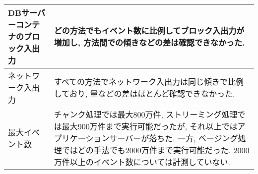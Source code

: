 \documentclass[../../../main]{subfiles}
\begin{document}
\begin{table}[H]
\begin{tabular}{|p{4cm}|p{10cm}|}
            DBサーバーコンテナのブロック入出力       & どの方法でもイベント数に比例してブロック入出力が増加し, 方法間での傾きなどの差は確認できなかった.                                                                                                                                                                                      \\ \hline
            ネットワーク入出力                & すべての方法でネットワーク入出力は同じ傾きで比例しており, 量などの差はほとんど確認できなかった.                                                                                                                                                                                    \\ \hline
            最大イベント数                  & チャンク処理では最大800万件, ストリーミング処理では最大900万件まで実行可能だったが, それ以上ではアプリケーションサーバーが落ちた. 一方, ページング処理ではどの手法でも2000万件まで実行可能だった. 2000万件以上のイベント数については計測していない.                                                     \\ \hline
        \end{tabular}
    \end{table}
\end{document}
